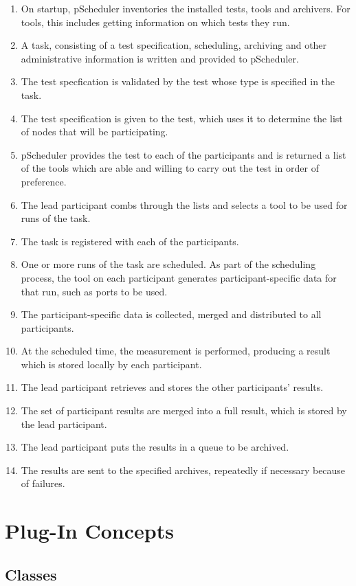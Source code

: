 \documentclass[10pt,titlepage]{article}
\begin{document}
\begin{enumerate}
\item On startup, pScheduler inventories the installed tests, tools
  and archivers.  For tools, this includes getting information on
  which tests they run.
\item A task, consisting of a test specification, scheduling,
  archiving and other administrative information is written and
  provided to pScheduler.
\item The test specfication is validated by the test whose type is
  specified in the task.
\item The test specification is given to the test, which uses it to
  determine the list of nodes that will be participating.
\item pScheduler provides the test to each of the participants and is
  returned a list of the tools which are able and willing to carry out
  the test in order of preference.
\item The lead participant combs through the lists and selects a tool
  to be used for runs of the task.
\item The task is registered with each of the participants.
\item One or more runs of the task are scheduled.  As part of the
  scheduling process, the tool on each participant generates
  participant-specific data for that run, such as ports to be used.
\item The participant-specific data is collected, merged and
  distributed to all participants.
\item At the scheduled time, the measurement is performed, producing a
  result which is stored locally by each participant.
\item The lead participant retrieves and stores the other
  participants' results.
\item The set of participant results are merged into a full result,
  which is stored by the lead participant.
\item The lead participant puts the results in a queue to be archived.
\item The results are sent to the specified archives, repeatedly if
  necessary because of failures.
\end{enumerate}


\section{Plug-In Concepts}

\subsection{Classes}
\end{document}
